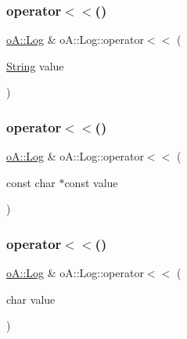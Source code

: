 \subsubsection{\texorpdfstring{operator$<$$<$()}{operator<<()}\hspace{0.1cm}{\footnotesize\ttfamily [2/9]}}
{\footnotesize\ttfamily \mbox{\hyperlink{classo_a_1_1_log}{o\+A\+::\+Log}} \& o\+A\+::\+Log\+::operator$<$$<$ (\begin{DoxyParamCaption}\item[{\mbox{\hyperlink{classo_a_1_1_string}{String}}}]{value }\end{DoxyParamCaption})}

\mbox{\label{classo_a_1_1_log_ae274c2ff1bc29ba718265e46fcc6207c}} 
\subsubsection{\texorpdfstring{operator$<$$<$()}{operator<<()}\hspace{0.1cm}{\footnotesize\ttfamily [3/9]}}
{\footnotesize\ttfamily \mbox{\hyperlink{classo_a_1_1_log}{o\+A\+::\+Log}} \& o\+A\+::\+Log\+::operator$<$$<$ (\begin{DoxyParamCaption}\item[{const char $\ast$const}]{value }\end{DoxyParamCaption})}

\mbox{\label{classo_a_1_1_log_a54dba53cce06861c82dc760d9c809633}} 
\subsubsection{\texorpdfstring{operator$<$$<$()}{operator<<()}\hspace{0.1cm}{\footnotesize\ttfamily [4/9]}}
{\footnotesize\ttfamily \mbox{\hyperlink{classo_a_1_1_log}{o\+A\+::\+Log}} \& o\+A\+::\+Log\+::operator$<$$<$ (\begin{DoxyParamCaption}\item[{char}]{value }\end{DoxyParamCaption})}

\mbox{\label{classo_a_1_1_log_a151d996709b215055998475e5610ea2c}} 

